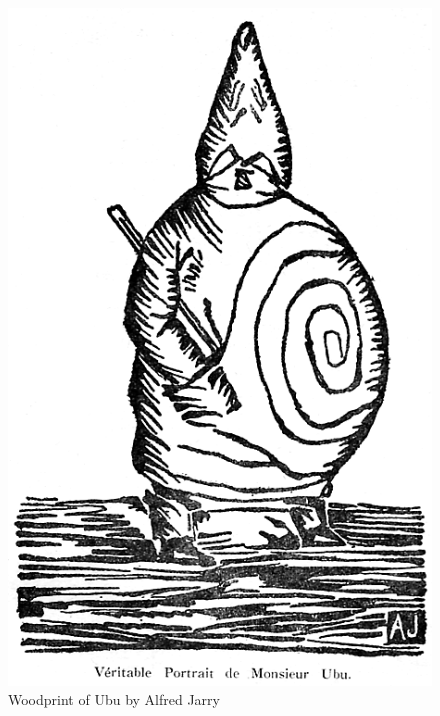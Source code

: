 \begin{figure}[!htbp] %
  \centering
  \includegraphics[height=0.3\textheight]{images/ubu}
  \caption[Ubu]{Woodprint of Ubu by Alfred Jarry}
  \label{fig:UBU}
\end{figure}

